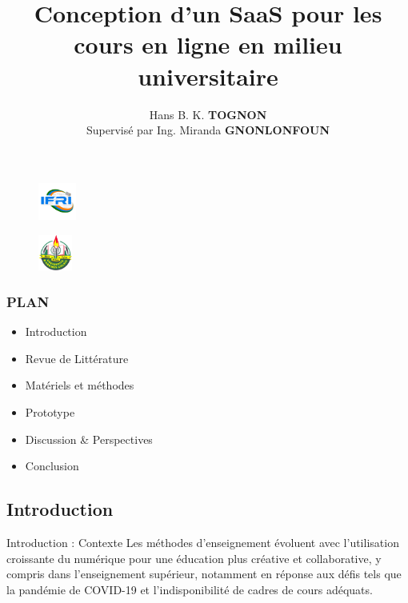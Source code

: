\documentclass{beamer}
\title{Conception d'un SaaS pour les cours en ligne en milieu universitaire}
\author[Hans TOGNON]{Hans B. K. \textbf{TOGNON} \\ Supervisé par Ing. Miranda \textbf{GNONLONFOUN}}
\institute[IFRI]{
\textbf{I}nstitut de \textbf{F}ormation et de \textbf{R}echerche en  \textbf{I}nformatique \\
\medskip
}
\begin{document}
\begin{frame}
  \thispagestyle{empty}
  \begin{multicols}{2}
    \begin{figure}
        \flushleft
        \includegraphics[width=0.11\textwidth]{logoifri}
    \end{figure}
    \begin{figure}
        \flushright
        \includegraphics[width=0.1\textwidth]{logouac}
    \end{figure}
    \end{multicols}
    \vspace{-1cm}
  \titlepage
  \end{frame}

\begin{frame}
  \frametitle{PLAN}
  \begin{itemize}
    \item Introduction
    \item Revue de Littérature
    \item Matériels et méthodes
    \item Prototype
    \item Discussion \& Perspectives
    \item Conclusion
  \end{itemize}
\end{frame}

\begin{frame}
  \begin{center}
    \section{\huge{Introduction}}
  \end{center}
\end{frame}

\begin{frame}{Introduction : \small{Contexte}}
  Les méthodes d'enseignement évoluent avec l'utilisation croissante 
  du numérique pour une éducation plus créative et collaborative, y 
  compris dans l'enseignement supérieur, notamment en réponse aux défis 
  tels que la pandémie de COVID-19 et l'indisponibilité de cadres de cours 
  adéquats.
\end{frame}
\end{document}
